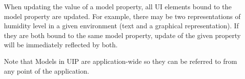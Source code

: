 When updating the value of a model property, all UI elements bound to the model property are updated. For example, there may be two representations of humidity level in a given environment (text and a graphical representation). If they are both bound to the same model property, update of the given property will be immediately reflected by both.

Note that Models in UIP are application-wide so they can be referred to from any point of the application.

\endinput